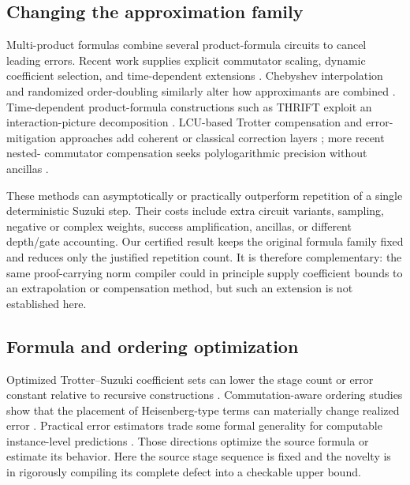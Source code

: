\subsection{Changing the approximation family}

Multi-product formulas combine several product-formula circuits to cancel
leading errors.  Recent work supplies explicit commutator scaling, dynamic
coefficient selection, and time-dependent extensions
\citep{zhuk2024dynamic,aftab2024mpf,mizuta2026mpf,mizuta2026timedependent}.
Chebyshev interpolation and randomized order-doubling similarly alter how
approximants are combined \citep{rendon2024chebyshev,cho2024doubling}.
Time-dependent product-formula constructions such as THRIFT exploit an
interaction-picture decomposition \citep{bosse2025thrift}.  LCU-based Trotter
compensation and error-mitigation approaches add coherent or classical
correction layers \citep{zeng2025lcu,watson2025mitigation}; more recent nested-
commutator compensation seeks polylogarithmic precision without ancillas
\citep{wang2026hncc}.

These methods can asymptotically or practically outperform repetition of a
single deterministic Suzuki step.  Their costs include extra circuit
variants, sampling, negative or complex weights, success amplification,
ancillas, or different depth/gate accounting.  Our certified result keeps the
original formula family fixed and reduces only the justified repetition
count.  It is therefore complementary: the same proof-carrying norm compiler
could in principle supply coefficient bounds to an extrapolation or
compensation method, but such an extension is not established here.

\subsection{Formula and ordering optimization}

Optimized Trotter--Suzuki coefficient sets can lower the stage count or error
constant relative to recursive constructions \citep{malezic2026schemes}.
Commutation-aware ordering studies show that the placement of Heisenberg-type
terms can materially change realized error \citep{tate2026ordering}.
Practical error estimators trade some formal generality for computable
instance-level predictions \citep{maxwell2026practical}.  Those directions
optimize the source formula or estimate its behavior.  Here the source stage
sequence is fixed and the novelty is in rigorously compiling its complete
defect into a checkable upper bound.

